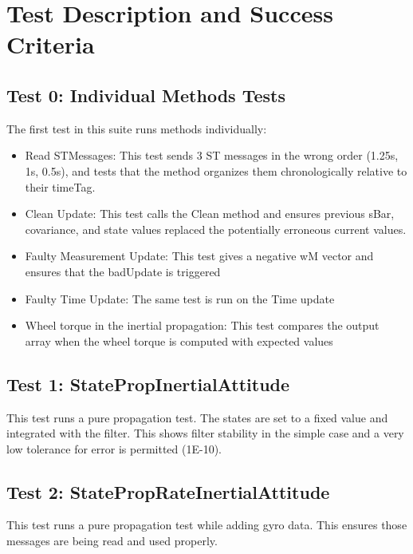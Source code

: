 
\newpage

\section{Test Description and Success Criteria}

\subsection{Test 0: Individual Methods Tests}

The first test in this suite runs methods individually:

\begin{itemize}
\item{Read STMessages:} This test sends 3 ST messages in the wrong order (1.25s, 1s, 0.5s), and tests that the method organizes them chronologically relative to their timeTag.
\item{Clean Update:} This test calls the Clean method and ensures previous sBar, covariance, and state values replaced the potentially erroneous current values.
\item{Faulty Measurement Update:} This test gives a negative wM vector and ensures that the badUpdate is triggered
\item{Faulty Time Update:} The same test is run on the Time update
\item{Wheel torque in the inertial propagation:} This test compares the output array when the wheel torque is computed with expected values
\end{itemize}

\subsection{Test 1: StatePropInertialAttitude}

This test runs a pure propagation test. The states are set to a fixed value and integrated with the filter.
This shows filter stability in the simple case and a very low tolerance for error is permitted (1E-10).

\subsection{Test 2: StatePropRateInertialAttitude}

This test runs a pure propagation test while adding gyro data. This ensures those messages are being read and used properly.

